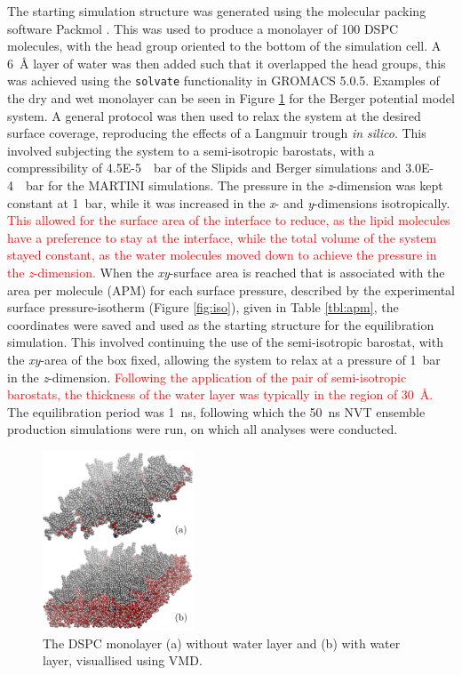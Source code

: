 \documentclass[amsmath,amssymb,twocolumn,superscriptaddress]{revtex4-1}
\begin{document}
The starting simulation structure was generated using the molecular packing
software Packmol \cite{martinez_packmol_2009}.
This was used to produce a monolayer of 100 DSPC molecules, with the head
group oriented to the bottom of the simulation cell.
A \SI{6}{\angstrom} layer of water was then added such that it overlapped
the head groups, this was achieved using the \texttt{solvate} functionality
in GROMACS 5.0.5.
Examples of the dry and wet monolayer can be seen in Figure \ref{fig:drywet}
for the Berger potential model system.
A general protocol was then used to relax the system at the desired surface
coverage, reproducing the effects of a Langmuir trough \emph{in silico}.
This involved subjecting the system to a semi-isotropic barostats, with a
compressibility of \SI{4.5E-5}{\per\bar} of the Slipids and Berger
simulations and \SI{3.0E-4}{\per\bar} for the MARTINI simulations.
The pressure in the \emph{z}-dimension was kept constant at \SI{1}{\bar},
while it was increased in the \emph{x}- and \emph{y}-dimensions isotropically.
\textcolor{red}{This allowed for the surface area of the interface to reduce, as the lipid
molecules have a preference to stay at the interface, while the total volume
of the system stayed constant, as the water molecules moved down to achieve
the pressure in the \emph{z}-dimension.}
When the \emph{xy}-surface area is reached that is associated with the area
per molecule (APM) for each surface pressure, described by the experimental
surface pressure-isotherm (Figure \ref{fig:iso}), given in
Table \ref{tbl:apm}, the coordinates were saved and used as the starting
structure for the equilibration simulation.
This involved continuing the use of the semi-isotropic barostat, with
the \emph{xy}-area of the box fixed, allowing the system to relax at a
pressure of \SI{1}{\bar} in the \emph{z}-dimension.
\textcolor{red}{Following the application of the pair of semi-isotropic
barostats, the thickness of the water layer was typically in the region
of \SI{30}{\angstrom}.}
The equilibration period was \SI{1}{\nano\second}, following which
the \SI{50}{\nano\second} NVT ensemble production simulations were run, on
which all analyses were conducted.
%
\begin{figure}[h]
\centering
  \includegraphics[width=0.4\textwidth]{dspcdrywet}
  \caption{The DSPC monolayer (a) without water layer and (b) with water
  layer, visuallised using VMD\cite{humphrey_vmd_1996}.}
  \label{fig:drywet}
\end{figure}
\end{document}
